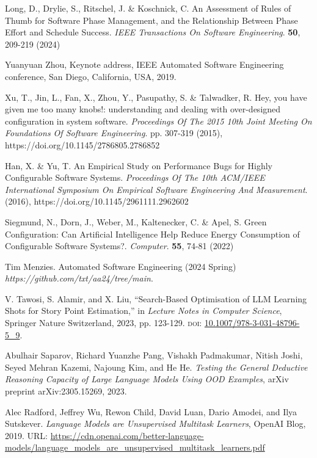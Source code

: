 \documentclass{ieeeaccess}
\begin{document}
\begin{thebibliography}{00}

Long, D., Drylie, S., Ritschel, J. \& Koschnick, C. An Assessment of Rules of Thumb for Software Phase Management, and the Relationship Between Phase Effort and Schedule Success. {\em IEEE Transactions On Software Engineering}. \textbf{50}, 209-219 (2024)

 Yuanyuan Zhou, Keynote address, IEEE Automated Software Engineering conference, San Diego, California, USA, 2019. 

Xu, T., Jin, L., Fan, X., Zhou, Y., Pasupathy, S. \& Talwadker, R. Hey, you have given me too many knobs!: understanding and dealing with over-designed configuration in system software. {\em Proceedings Of The 2015 10th Joint Meeting On Foundations Of Software Engineering}. pp. 307-319 (2015), https://doi.org/10.1145/2786805.2786852

Han, X. \& Yu, T. An Empirical Study on Performance Bugs for Highly Configurable Software Systems. {\em Proceedings Of The 10th ACM/IEEE International Symposium On Empirical Software Engineering And Measurement}. (2016), https://doi.org/10.1145/2961111.2962602

Siegmund, N., Dorn, J., Weber, M., Kaltenecker, C. \& Apel, S. Green Configuration: Can Artificial Intelligence Help Reduce Energy Consumption of Configurable Software Systems?. {\em Computer}. \textbf{55}, 74-81 (2022)

 Tim Menzies. Automated Software Engineering (2024 Spring) \emph{https://github.com/txt/aa24/tree/main}. 

 V. Tawosi, S. Alamir, and X. Liu, 
``Search-Based Optimisation of LLM Learning Shots for Story Point Estimation,'' 
in \emph{Lecture Notes in Computer Science}, 
Springer Nature Switzerland, 2023, pp. 123-129.
\textsc{doi}: \url{10.1007/978-3-031-48796-5_9}.

Abulhair Saparov, Richard Yuanzhe Pang, Vishakh Padmakumar, Nitish Joshi, Seyed Mehran Kazemi, Najoung Kim, and He He.
\textit{Testing the General Deductive Reasoning Capacity of Large Language Models Using OOD Examples},
arXiv preprint arXiv:2305.15269, 2023.


Alec Radford, Jeffrey Wu, Rewon Child, David Luan, Dario Amodei, and Ilya Sutskever.
\textit{Language Models are Unsupervised Multitask Learners},
OpenAI Blog, 2019.
URL: \url{https://cdn.openai.com/better-language-models/language_models_are_unsupervised_multitask_learners.pdf}


\end{thebibliography}
\end{document}
